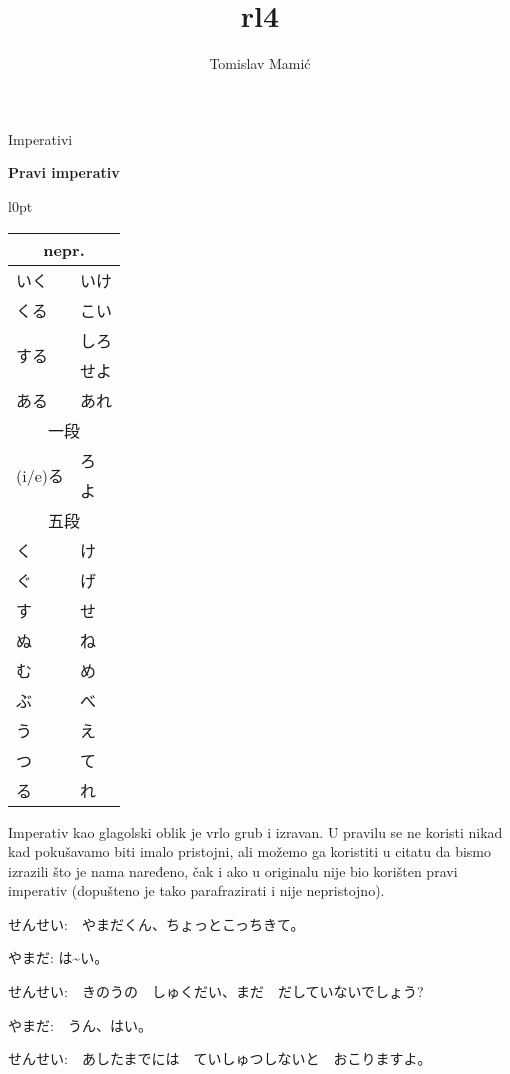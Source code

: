 \documentclass[12pt]{article}
\author{Tomislav Mamić}
\title{rl4}
\begin{document}
	\large Imperativi

	\vspace{20pt}
	\normalsize \textbf{Pravi imperativ}
	\vspace{20pt}
	
	\begin{wraptable}[17]{l}{0pt}
	\begin{tabular}{|l|l|}
		\hline
		\multicolumn{2}{|c|}{nepr.}\\
		\hline
		いく&いけ\\
		\hline
		くる&こい\\
		\hline
		\multirow{2}{50pt}{する}&しろ\\\cline{2-2}
		&せよ\footnotemark[1]\\
		\hline
		ある&あれ\\
		\hline
		\hline
		\multicolumn{2}{|c|}{一段}\\
		\hline
		\multirow{2}{50pt}{(i/e)る}&ろ\\\cline{2-2}
		&よ\footnotemark[1]\\
		\hline
		\hline
		\multicolumn{2}{|c|}{五段}\\
		\hline
		く&け\\
		ぐ&げ\\
		す&せ\\
		\hline
		ぬ&ね\\
		む&め\\
		ぶ&べ\\
		\hline
		う&え\\
		つ&て\\
		る&れ\\
		\hline
	\end{tabular}
	\end{wraptable}
	\vspace{20pt}

	Imperativ kao glagolski oblik je vrlo grub i izravan. U pravilu se ne koristi nikad kad pokušavamo biti imalo pristojni, ali možemo ga koristiti u citatu da bismo izrazili što je nama naređeno, čak i ako u originalu nije bio korišten pravi imperativ (dopušteno je tako parafrazirati i nije nepristojno).
	\vspace{5pt}
	
	せんせい:　やまだくん、ちょっとこっちきて。
	
	やまだ: は\textasciitilde い。
	
	せんせい:　きのうの　しゅくだい、まだ　だしていないでしょう?
	
	やまだ:　うん、はい。
	
	せんせい:　あしたまでには　ていしゅつしないと　おこりますよ。
	
\end{document}
